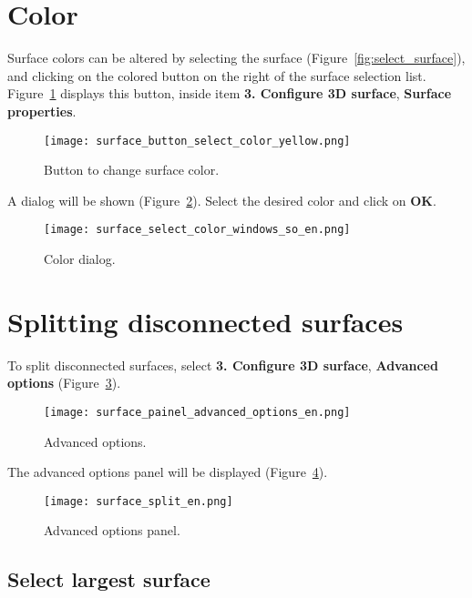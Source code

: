 \newpage

\section{Color}

Surface colors can be altered by selecting the surface (Figure~\ref{fig:select_surface}), and clicking on the colored button on the right of the surface selection list. Figure~\ref{fig:change_surface_color} displays this button, inside item \textbf{3. Configure 3D surface}, \textbf{Surface properties}.

\begin{figure}[!htb]
\centering
\texttt{[image: surface\_button\_select\_color\_yellow.png]}
\caption{Button to change surface color.}
\label{fig:change_surface_color}
\end{figure}

A dialog will be shown (Figure~\ref{fig:button_select_color}). Select the desired color and click on \textbf{OK}.

\begin{figure}[!htb]
\centering
\texttt{[image: surface\_select\_color\_windows\_so\_en.png]}
\caption{Color dialog.}
\label{fig:button_select_color}
\end{figure}

\section{Splitting disconnected surfaces}

To split disconnected surfaces, select \textbf{3. Configure 3D surface}, \textbf{Advanced options} (Figure~\ref{fig:advanced_tools}).

\begin{figure}[!htb]
\centering
\texttt{[image: surface\_painel\_advanced\_options\_en.png]}
\caption{Advanced options.}
\label{fig:advanced_tools}
\end{figure}

\newpage

The advanced options panel will be displayed (Figure~\ref{fig:advanced_tools_expanded}).

\begin{figure}[!htb]
\centering
\texttt{[image: surface\_split\_en.png]}
\caption{Advanced options panel.}
\label{fig:advanced_tools_expanded}
\end{figure}

\subsection{Select largest surface}

